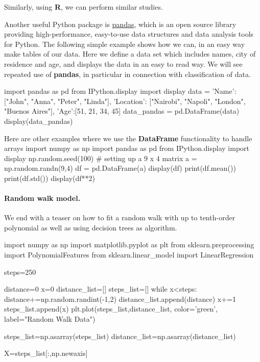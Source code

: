 \documentclass[%
oneside,                 %
final,                   %
10pt]{article}
\begin{document}
Similarly, using \textbf{R}, we can perform similar studies. 



Another useful Python package is
\href{{https://pandas.pydata.org/}}{pandas}, which is an open source library
providing high-performance, easy-to-use data structures and data
analysis tools for Python. The following simple example shows how we can, in an easy way make tables of our data. Here we define a data set which includes names, city of residence and age, and displays the data in an easy to read way. We will see repeated use of \textbf{pandas}, in particular in connection with classification of data. 

\bpycod
import pandas as pd
from IPython.display import display
data = {'Name': ["John", "Anna", "Peter", "Linda"], 'Location': ["Nairobi", "Napoli", "London", "Buenos Aires"], 'Age':[51, 21, 34, 45]}
data_pandas = pd.DataFrame(data)
display(data_pandas)
\epycod

Here are other examples where we use the \textbf{DataFrame} functionality to handle arrays
\bpycod
import numpy as np                                                                               
import pandas as pd
from IPython.display import display
np.random.seed(100)                                                                          
# setting up a 9 x 4 matrix
a = np.random.randn(9,4)
df = pd.DataFrame(a)   
display(df)
print(df.mean())
print(df.std())
display(df**2)
\epycod



\paragraph{Random walk model.}
We end with a  teaser on how to fit a random walk with up to tenth-order polynomial as well as using decision trees as algorithm. 

\bpycod
import numpy as np
import matplotlib.pyplot as plt
from sklearn.preprocessing import PolynomialFeatures
from sklearn.linear_model import LinearRegression

steps=250

distance=0
x=0
distance_list=[]
steps_list=[]
while x<steps:
    distance+=np.random.randint(-1,2)
    distance_list.append(distance)
    x+=1
    steps_list.append(x)
plt.plot(steps_list,distance_list, color='green', label="Random Walk Data")

steps_list=np.asarray(steps_list)
distance_list=np.asarray(distance_list)

X=steps_list[:,np.newaxis]
\end{document}
